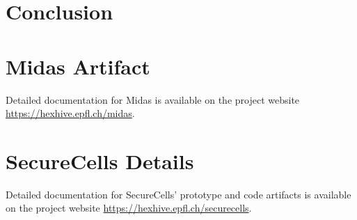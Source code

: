 \documentclass[lablogo]{thesis}
\newcommand{\seccells}{SecureCells\xspace}
\newcommand{\midas}{Midas\xspace}
\begin{document}
\chapter{Conclusion}
\label{ch:conclusion}


\begin{appendices}

\chapter{\midas Artifact}

Detailed documentation for \midas is available on the project website 
\url{https://hexhive.epfl.ch/midas}.



\chapter{\seccells Details}

Detailed documentation for \seccells{}' prototype and code artifacts is
available on the project website \url{https://hexhive.epfl.ch/securecells}.


\end{appendices}

\backmatter

{}
\printbibliography
\end{document}
